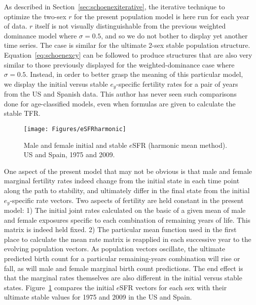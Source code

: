\FloatBarrier
As described in Section~\ref{sec:schoenexiterative}, the iterative technique to
optimize the two-sex $r$ for the present population model is here run for each year of data. $r$ itself
is not visually distinguishable from the previous weighted dominance model where $\sigma = 0.5$,
and so we do not bother to display yet another time series. The case is similar
for the ultimate 2-sex stable population structure. Equation~\eqref{eq:schoenexcy} can 
be followed to produce structures that are also very similar to those
previously displayed for the weighted-dominance case where $\sigma =
0.5$. Instead, in order to better grasp the meaning of this particular
model, we display the initial versus stable $e_y$-specific fertility rates for a
pair of years from the US and Spanish data. This author has never seen such
comparisons done for age-classified models, even when formulas are given to
calculate the stable TFR. 

\begin{figure}[ht!]
        \centering  
          \caption{Male and female initial and stable $e$SFR (harmonic mean
          method). US and Spain, 1975 and 2009.}
           \texttt{[image: Figures/eSFRharmonic]}
          \label{fig:eSFRharmonic}
\end{figure}

One aspect of the present model that may not be obvious is that male and female marginal
fertility rates indeed change from the initial state in each time point along
the path to stability, and ultimately differ in the final state from the initial
$e_y$-specific rate vectors. Two aspects of fertility are held constant in the
present model: 1) The initial joint rates calculated on the basic of a given
mean of male and female exposures specific to each combination of remaining
years of life. This matrix is indeed held fixed. 2) The particular mean function
used in the first place to calculate the mean rate matrix is reapplied in each
successive year to the evolving population vectors. As population vectors
oscillate, the ultimate predicted birth count for a particular remaining-years
combination will rise or fall, as will male and female marginal birth count
predictions. The end effect is that the marginal rates themselves are also
different in the initial versus stable states. Figure~\ref{fig:eSFRharmonic}
compares the initial $e$SFR vectors for each sex with their ultimate stable
values for 1975 and 2009 in the US and Spain.

